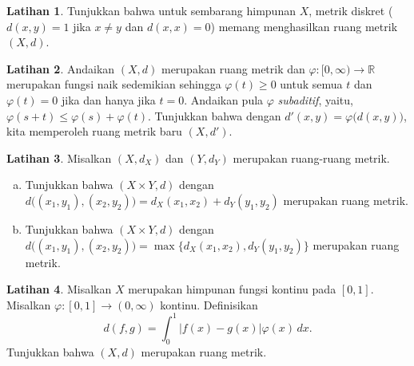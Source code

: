 \documentclass[12pt,openany]{book}
\newcommand{\babs}[1]{\bigl\lvert {#1} \bigr\rvert}
\newcommand{\R}{{\mathbb{R}}}
\newcommand{\myindex}[1]{#1\index{#1}}
\theoremstyle{plain}
\theoremstyle{remark}
\theoremstyle{definition}
\newenvironment{exbox}{%
    \def\FrameCommand{\vrule width 1pt \relax\hspace{10pt}}%
    \MakeFramed{\advance\hsize-\width\FrameRestore}%
}{%
    \endMakeFramed
}
\newenvironment{exparts}{%
    \leavevmode\begin{enumerate}[a),noitemsep,topsep=0pt,parsep=0pt,partopsep=0pt]
}{%
    \end{enumerate}
}
\theoremstyle{exercise}
\newtheorem{exercise}{Latihan}[section]
\theoremstyle{example}
\begin{document}
\begin{exbox}
\begin{exercise}
Tunjukkan bahwa untuk sembarang himpunan $X$, metrik diskret
($d(x,y) = 1$ jika $x \neq y$ dan $d(x,x) = 0$)
memang menghasilkan ruang metrik $(X,d)$.
\end{exercise}

\begin{exercise}
Andaikan $(X,d)$ merupakan ruang metrik dan
$\varphi \colon [0,\infty) \to \R$ merupakan
fungsi naik sedemikian sehingga 
$\varphi(t) \geq 0$ untuk semua $t$ dan $\varphi(t) = 0$ jika dan hanya jika
$t=0$.  Andaikan pula $\varphi$ \emph{\myindex{subaditif}},
yaitu, $\varphi(s+t) \leq \varphi(s)+\varphi(t)$.
Tunjukkan bahwa dengan $d'(x,y) = \varphi\bigl(d(x,y)\bigr)$, kita memperoleh
ruang metrik baru $(X,d')$.
\end{exercise}

\begin{exercise} \label{exercise:mscross}
Misalkan $(X,d_X)$ dan $(Y,d_Y)$ merupakan ruang-ruang metrik.
\begin{exparts}
\item
Tunjukkan bahwa $(X \times Y,d)$ dengan
$d\bigl( (x_1,y_1), (x_2,y_2) \bigr) = d_X(x_1,x_2) + d_Y(y_1,y_2)$ merupakan
ruang metrik.
\item
Tunjukkan bahwa $(X \times Y,d)$ dengan
$d\bigl( (x_1,y_1), (x_2,y_2) \bigr) = \max \{ d_X(x_1,x_2) , d_Y(y_1,y_2) \}$ merupakan
ruang metrik.
\end{exparts}
\end{exercise}

\begin{exercise}
Misalkan $X$ merupakan himpunan fungsi kontinu pada $[0,1]$.  Misalkan $\varphi \colon
[0,1] \to (0,\infty)$ kontinu.  Definisikan
\begin{equation*}
d(f,g) = \int_0^1 \babs{f(x)-g(x)}\varphi(x)\,dx .
\end{equation*}
Tunjukkan bahwa $(X,d)$ merupakan ruang metrik.
\end{exercise}


\end{exbox}
\end{document}
